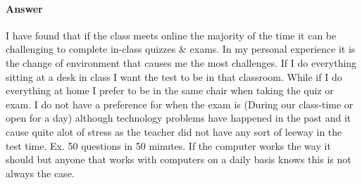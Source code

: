 \documentclass{article}
\begin{document}
\paragraph{Answer}


I have found that if the class meets online the majority of the time it can be challenging to complete in-class quizzes & exams. In my personal experience it is the change of environment that causes me the most challenges. If I do everything sitting at a desk in class I want the test to be in that classroom. While if I do everything at home I prefer to be in the same chair when taking the quiz or exam. I do not have a preference for when the exam is (During our class-time or open for a day) although technology problems have happened in the past and it cause quite alot of stress as the teacher did not have any sort of leeway in the test time. Ex. 50 questions in 50 minutes. If the computer works the way it should but anyone that works with computers on a daily basis knows this is not always the case.




\collab{\todo{}}
\end{document}

